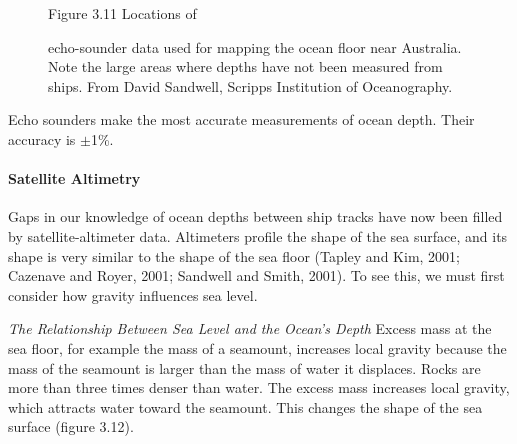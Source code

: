 \begin{figure}[t!]
\footnotesize
Figure 3.11 Locations of \rule{0pt}{5ex}echo-sounder data used for
mapping the ocean floor near Australia. Note the large areas where
depths have not been measured from ships. From David Sandwell, Scripps
Institution of Oceanography.

\label{fig:shiptracks10}
\vspace{-3ex}
\end{figure}

Echo sounders make the most
accurate measurements of ocean depth. Their
accuracy is $\pm$1\%.

\paragraph{Satellite Altimetry} Gaps in our knowledge of ocean depths between ship tracks have
now been filled by satellite-altimeter data. Altimeters profile the
shape of the sea surface, and its shape is very similar to the shape
of the sea floor (Tapley and Kim, 2001; Cazenave and Royer, 2001;
Sandwell and Smith, 2001). To see this, we must first consider how
gravity influences sea level.

\textit{The Relationship Between Sea Level and the Ocean's Depth}
Excess mass at the sea floor, for example the mass of a seamount,
increases local gravity because the mass of the seamount is larger
than the mass of water it displaces. Rocks are more than three times
denser than water. The excess mass increases local gravity, which
attracts water toward the seamount. This changes the shape of the sea
surface (figure 3.12).

